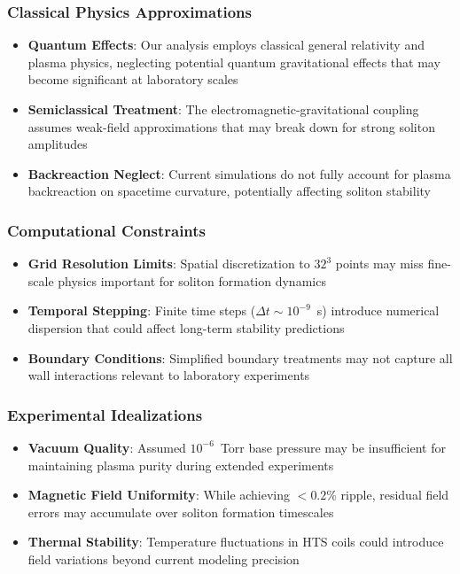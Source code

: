 \documentclass[12pt,a4paper]{article}
\begin{document}
\subsubsection{Classical Physics Approximations}
\begin{itemize}
\item \textbf{Quantum Effects}: Our analysis employs classical general relativity and plasma physics, neglecting potential quantum gravitational effects that may become significant at laboratory scales
\item \textbf{Semiclassical Treatment}: The electromagnetic-gravitational coupling assumes weak-field approximations that may break down for strong soliton amplitudes
\item \textbf{Backreaction Neglect}: Current simulations do not fully account for plasma backreaction on spacetime curvature, potentially affecting soliton stability
\end{itemize}

\subsubsection{Computational Constraints}
\begin{itemize}
\item \textbf{Grid Resolution Limits}: Spatial discretization to $32^3$ points may miss fine-scale physics important for soliton formation dynamics
\item \textbf{Temporal Stepping}: Finite time steps ($\Delta t \sim 10^{-9}$~s) introduce numerical dispersion that could affect long-term stability predictions
\item \textbf{Boundary Conditions}: Simplified boundary treatments may not capture all wall interactions relevant to laboratory experiments
\end{itemize}

\subsubsection{Experimental Idealizations}
\begin{itemize}
\item \textbf{Vacuum Quality}: Assumed $10^{-6}$~Torr base pressure may be insufficient for maintaining plasma purity during extended experiments
\item \textbf{Magnetic Field Uniformity}: While achieving $<0.2\%$ ripple, residual field errors may accumulate over soliton formation timescales
\item \textbf{Thermal Stability}: Temperature fluctuations in HTS coils could introduce field variations beyond current modeling precision
\end{itemize}
\end{document}
